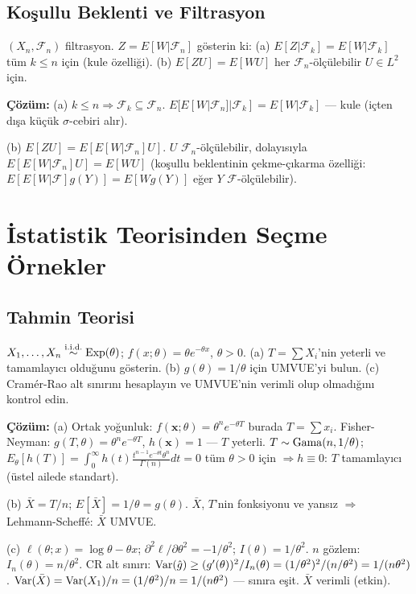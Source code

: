 \subsection{Koşullu Beklenti ve Filtrasyon}

\begin{ornek}
$(X_n,\mathcal{F}_n)$ filtrasyon. $Z=E[W|\mathcal{F}_n]$ gösterin ki:
(a) $E[Z|\mathcal{F}_k]=E[W|\mathcal{F}_k]$ tüm $k\leq n$ için (kule özelliği).
(b) $E[ZU]=E[WU]$ her $\mathcal{F}_n$-ölçülebilir $U\in L^2$ için.

\textbf{Çözüm:}
(a) $k\leq n\Rightarrow\mathcal{F}_k\subseteq\mathcal{F}_n$.
$E[E[W|\mathcal{F}_n]|\mathcal{F}_k]=E[W|\mathcal{F}_k]$ --- kule (içten dışa küçük $\sigma$-cebiri alır).

(b) $E[ZU]=E[E[W|\mathcal{F}_n]U]$. $U$ $\mathcal{F}_n$-ölçülebilir, dolayısıyla
$E[E[W|\mathcal{F}_n]U]=E[WU]$ (koşullu beklentinin çekme-çıkarma özelliği: $E[E[W|\mathcal{F}]g(Y)]=E[Wg(Y)]$ eğer $Y$ $\mathcal{F}$-ölçülebilir).
\end{ornek}

\section{İstatistik Teorisinden Seçme Örnekler}
\label{app:istatistik_ornekler}

\subsection{Tahmin Teorisi}

\begin{ornek}
$X_1,\ldots,X_n\overset{\text{i.i.d.}}{\sim}\operatorname{Exp}(\theta)$; $f(x;\theta)=\theta e^{-\theta x}$, $\theta>0$.
(a) $T=\sum X_i$'nin yeterli ve tamamlayıcı olduğunu gösterin.
(b) $g(\theta)=1/\theta$ için UMVUE'yi bulun.
(c) Cramér-Rao alt sınırını hesaplayın ve UMVUE'nin verimli olup olmadığını kontrol edin.

\textbf{Çözüm:}
(a) Ortak yoğunluk: $f(\mathbf{x};\theta)=\theta^n e^{-\theta T}$ burada $T=\sum x_i$. Fisher-Neyman: $g(T,\theta)=\theta^n e^{-\theta T}$, $h(\mathbf{x})=1$ --- $T$ yeterli.
$T\sim\operatorname{Gama}(n,1/\theta)$; $E_\theta[h(T)]=\int_0^\infty h(t)\frac{t^{n-1}e^{-\theta t}\theta^n}{\Gamma(n)}dt=0$ tüm $\theta>0$ için $\Rightarrow h\equiv0$: $T$ tamamlayıcı (üstel ailede standart).

(b) $\bar X=T/n$; $E[\bar X]=1/\theta=g(\theta)$. $\bar X$, $T$'nin fonksiyonu ve yansız $\Rightarrow$ Lehmann-Scheffé: $\bar X$ UMVUE.

(c) $\ell(\theta;x)=\log\theta-\theta x$; $\partial^2\ell/\partial\theta^2=-1/\theta^2$; $I(\theta)=1/\theta^2$.
$n$ gözlem: $I_n(\theta)=n/\theta^2$. CR alt sınırı: $\operatorname{Var}(\hat g)\geq (g'(\theta))^2/I_n(\theta)=(1/\theta^2)^2/(n/\theta^2)=1/(n\theta^2)$.
$\operatorname{Var}(\bar X)=\operatorname{Var}(X_1)/n=(1/\theta^2)/n=1/(n\theta^2)$ --- sınıra eşit. $\bar X$ verimli (etkin).
\end{ornek}

